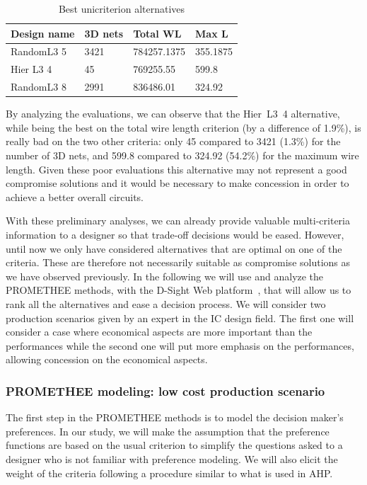 \documentclass{svmult}
\begin{document}
\begin{table}[h!]
    \begin{center}
        \caption{Best unicriterion alternatives}
        \label{tab:bestunicritalt}
        \begin{tabular}{p{2.3cm}p{1.5cm}p{2cm}p{1.3cm}}
            \hline
            Design name & 3D nets & Total WL & Max L\\
            \hline
            RandomL3 5 & 3421 & 784257.1375 & 355.1875 \\
            Hier L3 4 & 45 & 769255.55 & 599.8 \\
            RandomL3 8 & 2991 & 836486.01 & 324.92 \\
            \hline
        \end{tabular}
    \end{center}
\end{table}

By analyzing the evaluations, we can observe that the Hier~L3~4 alternative, while being the best on the total wire length criterion (by a difference of 1.9\%), is really bad on the two other criteria: only 45 compared to 3421 (1.3\%) for the number of 3D nets, and 599.8 compared to 324.92 (54.2\%) for the maximum wire length. Given these poor evaluations this alternative may not represent a good compromise solutions and it would be necessary to make concession in order to achieve a better overall circuits.

With these preliminary analyses, we can already provide valuable multi-criteria information to a designer so that trade-off decisions would be eased. However, until now we only have considered alternatives that are optimal on one of the criteria. These are therefore not necessarily suitable as compromise solutions as we have observed previously. In the following we will use and analyze the PROMETHEE methods, with the D-Sight Web platform~\cite{dsightweb,Hayez}, that will allow us to rank all the alternatives and ease a decision process. We will consider two production scenarios given by an expert in the IC design field. The first one will consider a case where economical aspects are more important than the performances while the second one will put more emphasis on the performances, allowing concession on the economical aspects.

\subsubsection{PROMETHEE modeling: low cost production scenario}
The first step in the PROMETHEE methods is to model the decision maker's preferences. In our study, we will make the assumption that the preference functions are based on the usual criterion to simplify the questions asked to a designer who is not familiar with preference modeling. We will also elicit the weight of the criteria following a procedure similar to what is used in AHP.
\end{document}

